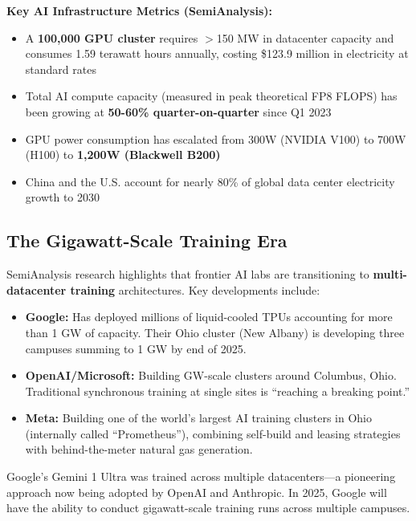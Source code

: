 \documentclass[11pt,a4paper]{article}
\begin{document}
\textbf{Key AI Infrastructure Metrics (SemiAnalysis):}
\begin{itemize}[leftmargin=*, itemsep=4pt]
    \item A \textbf{100,000 GPU cluster} requires $>$150 MW in datacenter capacity and consumes 1.59 terawatt hours annually, costing \$123.9 million in electricity at standard rates
    \item Total AI compute capacity (measured in peak theoretical FP8 FLOPS) has been growing at \textbf{50-60\% quarter-on-quarter} since Q1 2023
    \item GPU power consumption has escalated from 300W (NVIDIA V100) to 700W (H100) to \textbf{1,200W (Blackwell B200)}
    \item China and the U.S. account for nearly 80\% of global data center electricity growth to 2030
\end{itemize}

\subsection{The Gigawatt-Scale Training Era}

SemiAnalysis research highlights that frontier AI labs are transitioning to \textbf{multi-datacenter training} architectures. Key developments include:

\begin{itemize}[leftmargin=*, itemsep=4pt]
    \item \textbf{Google:} Has deployed millions of liquid-cooled TPUs accounting for more than 1 GW of capacity. Their Ohio cluster (New Albany) is developing three campuses summing to 1 GW by end of 2025.
    \item \textbf{OpenAI/Microsoft:} Building GW-scale clusters around Columbus, Ohio. Traditional synchronous training at single sites is ``reaching a breaking point.''
    \item \textbf{Meta:} Building one of the world's largest AI training clusters in Ohio (internally called ``Prometheus''), combining self-build and leasing strategies with behind-the-meter natural gas generation.
\end{itemize}

Google's Gemini 1 Ultra was trained across multiple datacenters—a pioneering approach now being adopted by OpenAI and Anthropic. In 2025, Google will have the ability to conduct gigawatt-scale training runs across multiple campuses.

\newpage
\end{document}
